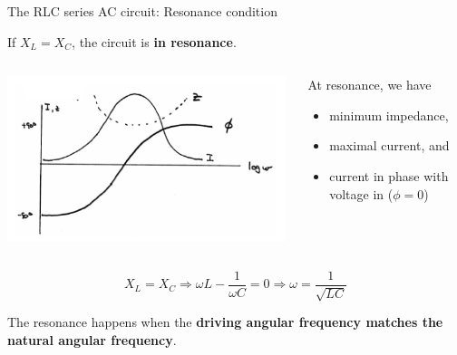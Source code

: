 \begin{frame}{The RLC series AC circuit: Resonance condition}

If $X_L = X_C$, the circuit is {\bf in resonance}.

\begin{columns}
  \begin{column}{0.60\textwidth}
    \begin{center}
        \includegraphics[width=0.99\textwidth]{./images/schematics/ac_rlc_resonance.png}\\
     \end{center}
  \end{column}
  \begin{column}{0.40\textwidth}
    At resonance, we have
    \begin{itemize}
       \item minimum impedance,
       \item maximal current, and
       \item current in phase with voltage in ($\phi=0$)
     \end{itemize}
  \end{column}
\end{columns}

\begin{equation*}
  X_L = X_C \Rightarrow \omega L - \frac{1}{\omega C} = 0 \Rightarrow \omega = \frac{1}{\sqrt{LC}}
\end{equation*}

The resonance happens when the {\bf driving angular frequency matches the natural angular frequency}.

\end{frame}

%
%
%

